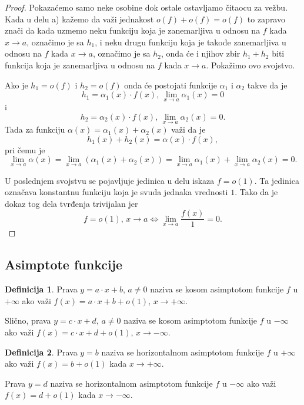 \documentclass[a4paper,12pt]{article}
\theoremstyle{plain}
\theoremstyle{definition}
\newtheorem{definition}{Definicija}[section]
\theoremstyle{remark}
\begin{document}
\begin{proof}
Pokazaćemo samo neke osobine dok ostale ostavljamo čitaocu za vežbu. Kada u delu a) kažemo da važi jednakost $o(f) + o(f) = o(f)$ to zapravo znači da kada uzmemo neku funkciju koja je zanemarljiva u odnosu na $f$ kada $x \to a$, označimo je sa $h_1$, i neku drugu funkciju koja je takođe zanemarljiva u odnosu na $f$ kada $x \to a$, označimo je sa $h_2$, onda će i njihov zbir $h_1 + h_2$ biti funkcija koja je zanemarljiva u odnosu na $f$ kada $x \to a$. Pokažimo ovo svojstvo.

Ako je $h_1 = o(f)$ i $h_2 = o(f)$ onda će postojati funkcije $\alpha_1$ i $\alpha_2$ takve da je
$$h_1 = \alpha_1(x) \cdot f(x), \, \lim_{x \to a} \alpha_1(x) = 0$$
i
$$h_2 = \alpha_2(x) \cdot f(x), \, \lim_{x \to a} \alpha_2(x) = 0.$$
Tada za funkciju $\alpha(x) = \alpha_1(x) + \alpha_2(x)$ važi da je
$$h_1(x) + h_2(x) = \alpha(x) \cdot f(x),$$
pri čemu je
$$\lim_{x \to a} \alpha(x) = \lim_{x \to a} (\alpha_1(x) + \alpha_2(x)) = \lim_{x \to a} \alpha_1(x) + \lim_{x \to a} \alpha_2(x) = 0.$$

U poslednjem svojstvu se pojavljuje jedinica u delu iskaza $f = o(1)$. Ta jedinica označava konstantnu funkciju koja je svuda jednaka vrednosti $1$. Tako da je dokaz tog dela tvrđenja trivijalan jer
$$f = o(1), \, x \to a \iff \lim_{x \to a} \frac{f(x)}{1} = 0.$$
\end{proof}

\subsection{Asimptote funkcije}
\begin{definition}
Prava $y = a \cdot x + b, \, a \neq 0$ naziva se kosom asimptotom funkcije $f$ u $+\infty$ ako važi $f(x) = a \cdot x + b + o(1), \, x \to +\infty$.

Slično, prava $y = c \cdot x + d, \, a \neq 0$ naziva se kosom asimptotom funkcije $f$ u $-\infty$ ako važi $f(x) = c \cdot x + d + o(1), \, x \to -\infty$.
\end{definition}

\begin{definition}
Prava $y = b$ naziva se horizontalnom asimptotom funkcije $f$ u $+\infty$ ako važi $f(x) = b + o(1)$ kada $x \to +\infty$.

Prava $y = d$ naziva se horizontalnom asimptotom funkcije $f$ u $-\infty$ ako važi $f(x) = d + o(1)$ kada $x \to -\infty$.
\end{definition}
\end{document}
